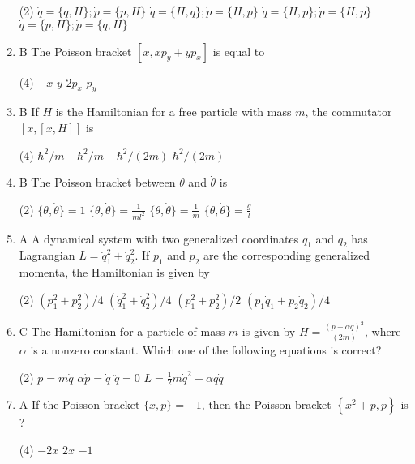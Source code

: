 \begin{enumerate}
{}
	 \begin{tasks}(2)
		\task[\textbf{a.}]$\dot{q}=\{q, H\} ; \dot{p}=\{p, H\}$
		\task[\textbf{b.}]$\dot{q}=\{H, q\} ; \dot{p}=\{H, p\}$
		\task[\textbf{c.}]$\dot{q}=\{H, p\} ; \dot{p}=\{H, p\}$
		\task[\textbf{d.}] $\dot{q}=\{p, H\} ; \dot{p}=\{q, H\}$
	\end{tasks}
	\item B The Poisson bracket $\left[x, x p_{y}+y p_{x}\right]$ is equal to
{}
	 \begin{tasks}(4)
		\task[\textbf{a.}] $-x$
		\task[\textbf{b.}]$y$
		\task[\textbf{c.}]$2 p_{x}$
		\task[\textbf{d.}] $p_{y}$
	\end{tasks}
	\item B If $H$ is the Hamiltonian for a free particle with mass $m$, the commutator $[x,[x, H]]$ is
	{}
	 \begin{tasks}(4)
		\task[\textbf{a.}]$\hbar^{2} / m$
		\task[\textbf{b.}]$-\hbar^{2} / m$
		\task[\textbf{c.}]$-\hbar^{2} /(2 m)$
		\task[\textbf{d.}] $\hbar^{2} /(2 m)$
	\end{tasks}
	\item B The Poisson bracket between $\theta$ and $\dot{\theta}$ is
{}
	 \begin{tasks}(2)
		\task[\textbf{a.}]$\{\theta, \dot{\theta}\}=1$
		\task[\textbf{b.}] $\{\theta, \dot{\theta}\}=\frac{1}{m l^{2}}$
		\task[\textbf{c.}]$\{\theta, \dot{\theta}\}=\frac{1}{m}$
		\task[\textbf{d.}] $\{\theta, \dot{\theta}\}=\frac{g}{l}$
	\end{tasks}
	\item A A dynamical system with two generalized coordinates $q_{1}$ and $q_{2}$ has Lagrangian $L=\dot{q}_{1}^{2}+\dot{q}_{2}^{2}$. If $p_{1}$ and $p_{2}$ are the corresponding generalized momenta, the Hamiltonian is given by
	{}
	 \begin{tasks}(2)
		\task[\textbf{a.}]$\left(p_{1}^{2}+p_{2}^{2}\right) / 4$
		\task[\textbf{b.}] $\left(\dot{q}_{1}^{2}+\dot{q}_{2}^{2}\right) / 4$
		\task[\textbf{c.}] $\left(p_{1}^{2}+p_{2}^{2}\right) / 2$
		\task[\textbf{d.}]  $\left(p_{1} \dot{q}_{1}+p_{2} \dot{q}_{2}\right) / 4$
	\end{tasks}
\item C The Hamiltonian for a particle of mass $m$ is given by $H=\frac{(p-\alpha q)^{2}}{(2 m)}$, where $\alpha$ is a nonzero constant. Which one of the following equations is correct?
{}
 \begin{tasks}(2)
	\task[\textbf{a.}]$p=m \dot{q}$
	\task[\textbf{b.}]$\alpha \dot{p}=\dot{q}$
	\task[\textbf{c.}] $\ddot{q}=0$
	\task[\textbf{d.}] $L=\frac{1}{2} m \dot{q}^{2}-\alpha q \dot{q}$
\end{tasks}
\item A If the Poisson bracket $\{x, p\}=-1$, then the Poisson bracket $\left\{x^{2}+p, p\right\}$ is ?
{}
 \begin{tasks}(4)
	\task[\textbf{a.}] $-2 x$
	\task[\textbf{b.}]$2 x$
	\task[\textbf{d.}] $-1$
\end{tasks}
\end{enumerate}
